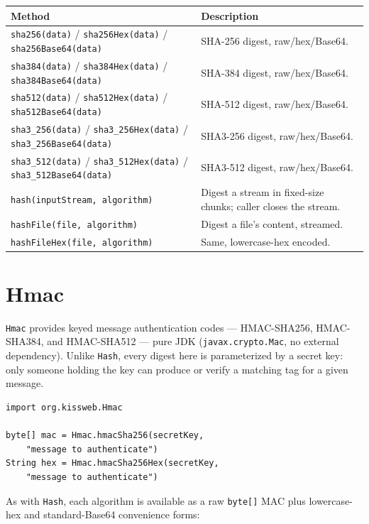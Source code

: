 \begin{longtable}{P{4.8cm}P{5.7cm}}
\toprule
\textbf{Method} & \textbf{Description} \\
\midrule
\endhead
\texttt{sha256(data)} / \texttt{sha256Hex(data)} / \texttt{sha256Base64(data)} & SHA-256 digest, raw/hex/Base64. \\
\texttt{sha384(data)} / \texttt{sha384Hex(data)} / \texttt{sha384Base64(data)} & SHA-384 digest, raw/hex/Base64. \\
\texttt{sha512(data)} / \texttt{sha512Hex(data)} / \texttt{sha512Base64(data)} & SHA-512 digest, raw/hex/Base64. \\
\texttt{sha3\_256(data)} / \texttt{sha3\_256Hex(data)} / \texttt{sha3\_256Base64(data)} & SHA3-256 digest, raw/hex/Base64. \\
\texttt{sha3\_512(data)} / \texttt{sha3\_512Hex(data)} / \texttt{sha3\_512Base64(data)} & SHA3-512 digest, raw/hex/Base64. \\
\texttt{hash(inputStream, algorithm)} & Digest a stream in fixed-size chunks; caller closes the stream. \\
\texttt{hashFile(file, algorithm)} & Digest a file's content, streamed. \\
\texttt{hashFileHex(file, algorithm)} & Same, lowercase-hex encoded. \\
\bottomrule
\end{longtable}

\section{Hmac}
\label{sec:util-hmac}

\texttt{Hmac} provides keyed message authentication codes --- HMAC-SHA256, HMAC-SHA384, and HMAC-SHA512 --- pure JDK (\texttt{javax.crypto.Mac}, no external dependency).  Unlike \texttt{Hash}, every digest here is parameterized by a secret key: only someone holding the key can produce or verify a matching tag for a given message.

\begin{lstlisting}[style=groovy]
import org.kissweb.Hmac

byte[] mac = Hmac.hmacSha256(secretKey,
    "message to authenticate")
String hex = Hmac.hmacSha256Hex(secretKey,
    "message to authenticate")
\end{lstlisting}

\noindent
As with \texttt{Hash}, each algorithm is available as a raw \texttt{byte[]} MAC plus lowercase-hex and standard-Base64 convenience forms:


